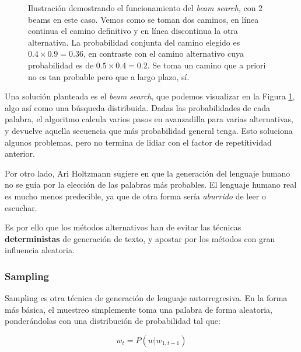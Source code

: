 \begin{figure}[h!]

	\caption{Ilustración demostrando el funcionamiento del \textit{beam search}, con 2 beams en este caso. Vemos como se toman dos caminos, en línea continua el camino definitivo y en línea discontinua la otra alternativa. La probabilidad conjunta del camino elegido es $0.4 \times 0.9 = 0.36$, en contraste con el camino alternativo cuya probabilidad es de $0.5 \times 0.4 = 0.2$. Se toma un camino que a priori no es tan probable pero que a largo plazo, sí.}
	\label{tkz:beams}
\end{figure}


Una solución planteada es el \textit{beam search}, que podemos visualizar en la Figura \ref{tkz:beams}, algo así como una búsqueda distribuida. Dadas las probabilidades de cada palabra, el algoritmo calcula varios pasos en avanzadilla para varias alternativas, y devuelve aquella secuencia que más probabilidad general tenga. Esto soluciona algunos problemas, pero no termina de lidiar con el factor de repetitividad anterior. 

Por otro lado, Ari Holtzmann sugiere en \cite{holtzman2020curious} que la generación del lenguaje humano no se guía por la elección de las palabras más probables. El lenguaje humano real es mucho menos predecible, ya que de otra forma sería \textit{aburrido} de leer o escuchar.

Es por ello que los métodos alternativos han de evitar las técnicas \textbf{deterministas} de generación de texto, y apostar por los métodos con gran influencia aleatoria.

\subsubsection{Sampling}

Sampling es otra técnica de generación de lenguaje autorregresiva. En la forma más básica, el muestreo simplemente toma una palabra de forma aleatoria, ponderándolas con una distribución de probabilidad tal que:

\begin{equation}
	w_t = P(w | w_{1, t-1})
\end{equation}

